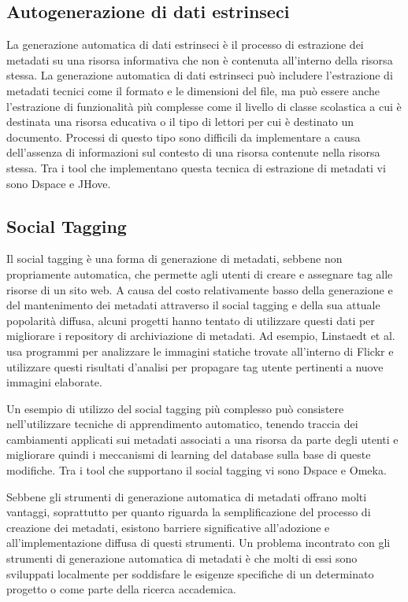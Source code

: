 \subsection{Autogenerazione di dati estrinseci}
La generazione automatica di dati estrinseci è il processo di estrazione dei metadati su una risorsa informativa che non è contenuta all'interno della risorsa stessa. La generazione automatica di dati estrinseci può includere l'estrazione di metadati tecnici come il formato e le dimensioni del file, ma può essere anche l'estrazione di funzionalità più complesse come il livello di classe scolastica a cui è destinata una risorsa educativa o il tipo di lettori per cui è destinato un documento.
Processi di questo tipo sono difficili da implementare a causa dell'assenza di informazioni sul contesto di una risorsa
contenute nella risorsa stessa.
Tra i tool che implementano questa tecnica di estrazione di metadati vi sono Dspace e JHove.

\subsection{Social Tagging}
Il social tagging è una forma di generazione di metadati, sebbene non propriamente automatica, che permette agli utenti di creare e assegnare tag alle risorse di un sito web. A causa del costo relativamente basso della generazione e del mantenimento dei metadati attraverso il social tagging e della sua attuale popolarità diffusa, alcuni progetti hanno tentato di utilizzare questi dati per migliorare i repository di archiviazione di metadati. Ad esempio, Linstaedt et al. usa programmi per analizzare le immagini statiche trovate all'interno di Flickr e utilizzare questi risultati d'analisi per propagare tag utente pertinenti a nuove immagini elaborate.

Un esempio di utilizzo del social tagging più complesso può consistere nell'utilizzare tecniche di apprendimento automatico, tenendo traccia dei cambiamenti applicati sui metadati associati a una risorsa da parte degli utenti e migliorare quindi i meccanismi di learning del database sulla base di queste modifiche.
Tra i tool che supportano il social tagging vi sono Dspace e Omeka.

Sebbene gli strumenti di generazione automatica di metadati offrano molti vantaggi, soprattutto per quanto riguarda la semplificazione del processo di creazione dei metadati, esistono barriere significative all'adozione e all'implementazione diffusa di questi strumenti. Un problema incontrato con gli strumenti di generazione automatica di metadati è che molti di essi sono sviluppati localmente per soddisfare le esigenze specifiche di un determinato progetto o come parte della ricerca accademica.

